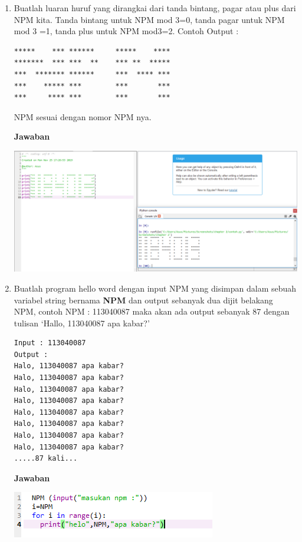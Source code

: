 \begin{enumerate}
\item
Buatlah luaran huruf yang dirangkai dari tanda bintang, pagar atau plus dari NPM kita.
Tanda bintang untuk NPM mod 3=0, tanda pagar untuk NPM mod 3 =1, tanda plus untuk NPM mod3=2.
Contoh Output : 
\begin{verbatim}
*****    *** ******     *****    ****
*******  *** ***  **    *** **  *****
***  ******* ******     ***  **** ***
***    ***** ***        ***       ***
***     **** ***        ***       ***
\end{verbatim}
NPM sesuai dengan nomor NPM nya.
\par\textbf{Jawaban}
    \begin{center}
        \centering
        \includegraphics[scale=0.5]{figures/chapter 2/14.PNG}
    \end{center}
\item
Buatlah program hello word dengan input NPM yang disimpan dalam sebuah variabel string bernama \textbf{NPM} dan output sebanyak dua dijit belakang NPM, 
contoh NPM : 113040087 maka akan ada output sebanyak 87 dengan tulisan `Hallo, 113040087 apa kabar?'
\begin{verbatim}
Input : 113040087
Output : 
Halo, 113040087 apa kabar? 
Halo, 113040087 apa kabar?
Halo, 113040087 apa kabar?
Halo, 113040087 apa kabar?
Halo, 113040087 apa kabar?
Halo, 113040087 apa kabar?
Halo, 113040087 apa kabar?
Halo, 113040087 apa kabar?
.....87 kali...
\end{verbatim}
\par\textbf{Jawaban} 
    \begin{center}
        \centering
        \includegraphics[scale=1.5]{figures/chapter 2/15.PNG}
    \end{center}

\end{enumerate}
